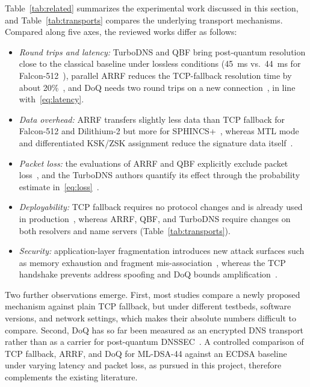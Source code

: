 \documentclass[conference]{IEEEtran}
\begin{document}
Table~\ref{tab:related} summarizes the experimental work discussed in this
section, and Table~\ref{tab:transports} compares the underlying transport
mechanisms. Compared along five axes, the reviewed works differ as follows:
\begin{itemize}
\item \emph{Round trips and latency:} TurboDNS and QBF bring post-quantum
resolution close to the classical baseline under lossless conditions (45~ms
vs.\ 44~ms for Falcon-512~\cite{turbodns}), parallel ARRF reduces the
TCP-fallback resolution time by about 20\%~\cite{arrf}, and DoQ needs two
round trips on a new connection~\cite{doqfirstlook}, in line
with~\eqref{eq:latency}.
\item \emph{Data overhead:} ARRF transfers slightly less data than TCP fallback
for Falcon-512 and Dilithium-2 but more for SPHINCS+~\cite{arrf}, whereas MTL
mode and differentiated KSK/ZSK assignment reduce the signature data
itself~\cite{mtl,differentiated}.
\item \emph{Packet loss:} the evaluations of ARRF and QBF explicitly exclude
packet loss~\cite{arrf,qbf}, and the TurboDNS authors quantify its effect
through the probability estimate in~\eqref{eq:loss}~\cite{turbodns}.
\item \emph{Deployability:} TCP fallback requires no protocol changes and is
already used in production~\cite{cloudflareblog}, whereas ARRF, QBF, and
TurboDNS require changes on both resolvers and name servers
(Table~\ref{tab:transports}).
\item \emph{Security:} application-layer fragmentation introduces new attack
surfaces such as memory exhaustion and fragment
mis-association~\cite{arrfsec,fragmisassoc}, whereas the TCP handshake
prevents address spoofing and DoQ bounds amplification~\cite{rfc7766,rfc9250}.
\end{itemize}

Two further observations emerge. First, most studies compare a newly proposed
mechanism against plain TCP fallback, but under different testbeds, software
versions, and network settings, which makes their absolute numbers difficult to
compare. Second, DoQ has so far been measured as an encrypted DNS transport
rather than as a carrier for post-quantum DNSSEC~\cite{doqfirstlook}. A
controlled comparison of TCP fallback, ARRF, and DoQ for ML-DSA-44 against an
ECDSA baseline under varying latency and packet loss, as pursued in this
project, therefore complements the existing literature.
\end{document}

